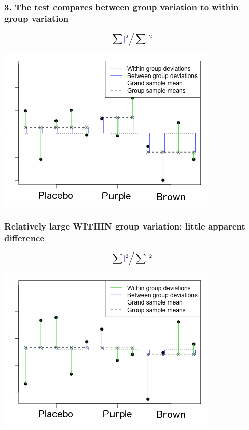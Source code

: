 \documentclass[slidestop,compress,mathserif,12pt,t,professionalfonts,xcolor=table]{beamer}
\begin{document}
\begin{frame}
\frametitle{3. The test compares between group variation to within group variation}

\[ \sum {\color{blue} \mid}^2 \Big/ \sum {\color{green} \mid}^2 \]

\begin{center}
\includegraphics[scale=0.6]{figures/anova-middle-ground-jelly-bean}
\end{center}

\end{frame}


\begin{frame}
\frametitle{Relatively large WITHIN group variation: little apparent difference}

\[ \sum {\color{blue} \mid}^2 \Big/ \sum {\color{green} \mid}^2 \]

\begin{center}
\includegraphics[scale=0.6]{figures/anova-lots-of-within-group-jelly-bean}
\end{center}

\end{frame}
\end{document}
